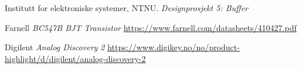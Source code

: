     Institutt for elektroniske systemer, NTNU.
    \emph{Designprosjekt 5: Buffer}

    Farnell
    \emph{BC547B BJT Transistor}
    \url{https://www.farnell.com/datasheets/410427.pdf}

    Digilent
    \emph{Analog Discovery 2}
    \url{https://www.digikey.no/no/product-highlight/d/digilent/analog-discovery-2}
